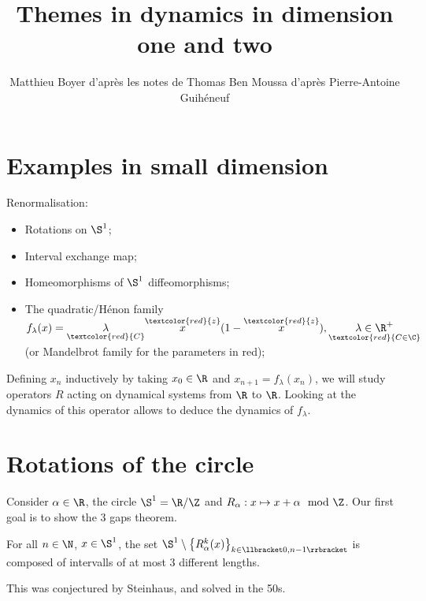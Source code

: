 \documentclass[english, info, math]{mpb-cours}
\title{Themes in dynamics in dimension one and two}
\author{Matthieu Boyer d'après les notes de Thomas Ben Moussa d'après Pierre-Antoine Guihéneuf}
\def\cred#1{\textcolor{red}{#1}}
\begin{document}
\bettertitle

\section*{Examples in small dimension}
Renormalisation:
\begin{itemize}
	\item Rotations on $\S^{1}$;
	\item Interval exchange map;
	\item Homeomorphisms of $\S^{1}$ diffeomorphisms;
	\item The quadratic/Hénon family $f_{\lambda}(x) = \underset{\cred{C}}{\lambda}\overset{\cred{z}}{x}(1 - \overset{\cred{z}}{x}), \underset{\cred{C \in \C}}{\lambda \in \R^{+}}$ (or Mandelbrot family for the parameters in red);
\end{itemize}
Defining $x_{n}$ inductively by taking $x_{0} \in \R$ and $x_{n + 1} = f_{\lambda}(x_{n})$, we will study
operators $R$ acting on dynamical systems from $\R$ to $\R$.
Looking at the dynamics of this operator allows to deduce the dynamics of $f_{\lambda}$.


\section{Rotations of the circle}
Consider $\alpha \in \R$, the circle $\S^{1} = \R / \Z$ and $R_{\alpha}: x \mapsto x + \alpha \mod \Z$.
Our first goal is to show the $3$ gaps theorem.
\begin{thm}[3 gaps]
	For all $n \in \N$, $x \in \S^{1}$, the set $\S^{1} \setminus \left\{R_{\alpha}^{k}(x)\right\}_{k\in \llbracket 0, n - 1\rrbracket}$ is composed of intervalls of at most $3$ different lengths.
\end{thm}
This was conjectured by Steinhaus, and solved in the 50s.
\end{document}
